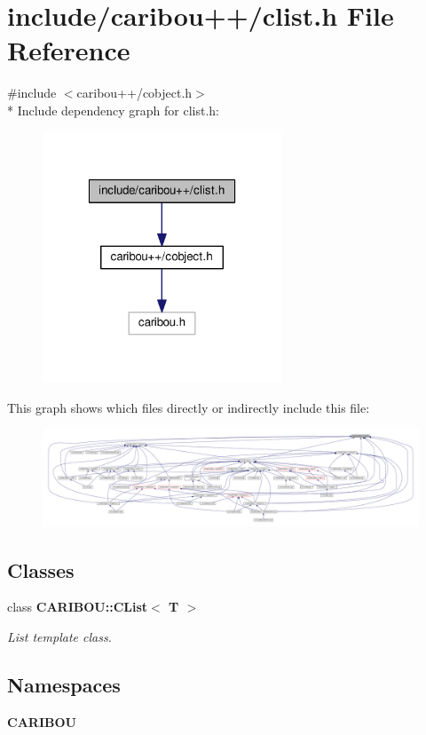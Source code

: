 \section{include/caribou++/clist.h File Reference}
\label{clist_8h}
{\ttfamily \#include $<$caribou++/cobject.\-h$>$}\\*
Include dependency graph for clist.\-h\-:\nopagebreak
\begin{figure}[H]
\begin{center}
\leavevmode
\includegraphics[width=202pt]{clist_8h__incl}
\end{center}
\end{figure}
This graph shows which files directly or indirectly include this file\-:\nopagebreak
\begin{figure}[H]
\begin{center}
\leavevmode
\includegraphics[width=350pt]{clist_8h__dep__incl}
\end{center}
\end{figure}
\subsection*{Classes}
\begin{DoxyCompactItemize}
\item 
class {\bf C\-A\-R\-I\-B\-O\-U\-::\-C\-List$<$ T $>$}
\begin{DoxyCompactList}\small\item\em List template class. \end{DoxyCompactList}\end{DoxyCompactItemize}
\subsection*{Namespaces}
\begin{DoxyCompactItemize}
\item 
{\bf C\-A\-R\-I\-B\-O\-U}
\end{DoxyCompactItemize}
